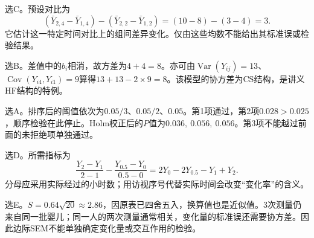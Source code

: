 选C。预设对比为
\[
(\bar Y_{2,4}-\bar Y_{1,4})-(\bar Y_{2,2}-\bar Y_{1,2})=(10-8)-(3-4)=3.
\]
它估计这一特定时间对比上的组间差异变化。仅由这些均数不能给出其标准误或检验结果。
\par\nobreak\smallskip{}

选B。差值中的$b_i$相消，故方差为$4+4=8$。亦可由$\operatorname{Var}(Y_{ij})=13$、$\operatorname{Cov}(Y_{i4},Y_{i1})=9$算得$13+13-2\times9=8$。该模型的协方差为CS结构，是讲义HF结构的特例。
\par\nobreak\smallskip{}

选A。排序后的阈值依次为$0.05/3$、$0.05/2$、$0.05$。第1项通过，第2项$0.028>0.025$，顺序检验在此停止。Holm校正后的$P$值为$0.036,\ 0.056,\ 0.056$。第3项不能越过前面的未拒绝项单独通过。
\par\nobreak\smallskip{}

选D。所需指标为
\[
\frac{Y_2-Y_1}{2-1}-\frac{Y_{0.5}-Y_0}{0.5-0}
=2Y_0-2Y_{0.5}-Y_1+Y_2.
\]
分母应采用实际经过的小时数；用访视序号代替实际时间会改变“变化率”的含义。
\par\nobreak\smallskip{}

选E。$S=0.64\sqrt{20}\approx2.86$，因原表已四舍五入，换算值也是近似值。3次测量仍来自同一批婴儿；同一人的两次测量通常相关，变化量的标准误还需要协方差。因此边际SEM不能单独确定变化量或交互作用的检验。
\par\nobreak\smallskip{}

